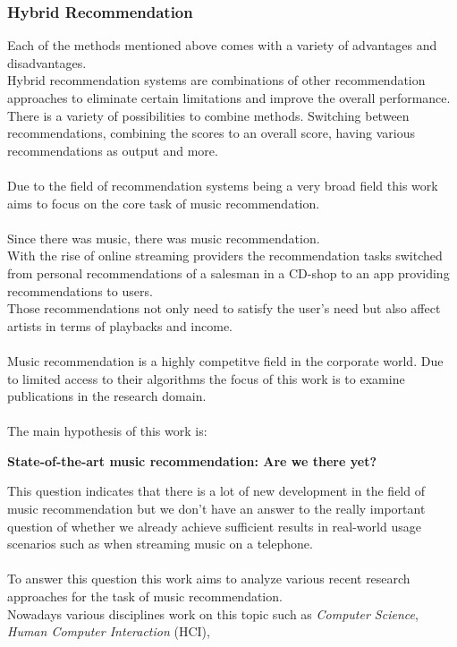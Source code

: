 \documentclass[runningheads,a4paper]{llncs}
\begin{document}
\subsubsection{Hybrid Recommendation}
Each of the methods mentioned above comes with a variety of advantages and disadvantages. \\
Hybrid recommendation systems are combinations of other recommendation approaches to eliminate certain 
limitations and improve the overall performance. 
There is a variety of possibilities to combine methods.
Switching between recommendations, combining the scores to an overall score, having various recommendations as output
 and more. \cite{burke2002hybrid}\\
\\
Due to the field of recommendation systems being a very broad field this work aims to 
focus on the core task of music recommendation. \\
\\
Since there was music, there was music recommendation. \\
With the rise of online streaming providers the recommendation tasks switched from personal recommendations 
of a salesman in a CD-shop to an app providing recommendations to users.\\
Those recommendations not only need to satisfy the user's need but also affect artists in terms 
of playbacks and income. \\
\\
Music recommendation is a highly competitve field in the corporate world. Due 
to limited access to their algorithms the focus of this work is to examine publications in the research domain. \\
\\ 
The main hypothesis of this work is:
\begin{center}
  \textbf{State-of-the-art music recommendation: Are we there yet?}
\end{center}
This question indicates that there is a lot of new development in the field of music recommendation but we don't have an answer to the really important question of whether we already achieve 
sufficient results in real-world usage scenarios such as when streaming music on a telephone.\\
\\
To answer this question this work aims to analyze various recent research approaches for the task of music recommendation.\\
Nowadays various disciplines work on this topic such as \textit{Computer Science}, \textit{Human Computer Interaction} (HCI), 
\end{document}
